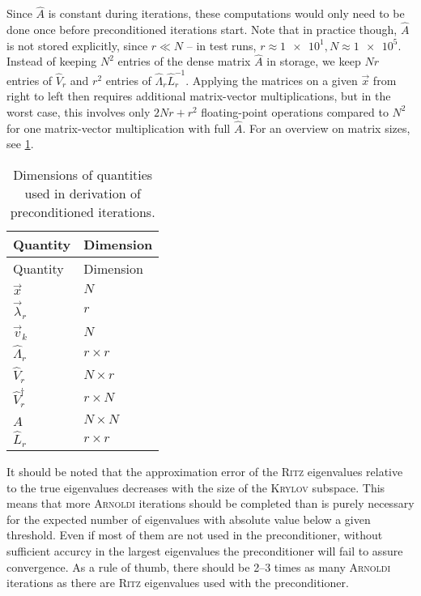 Since $\hat{A}$ is constant during iterations, these computations would only need to be done once before preconditioned iterations start. Note that in practice though, $\hat{A}$ is not stored explicitly, since $r \ll N$ -- in test runs, $r \approx \num{1e1}, N \approx \num{1e5}$. Instead of keeping $N^2$ entries of the dense matrix $\hat{A}$ in storage, we keep $N r$ entries of $\hat{V}_{r}$ and $r^2$ entries of $\hat{\Lambda}_{r} \hat{L}_{r}^{-1}$. Applying the matrices on a given $\vec{x}$ from right to left then requires additional matrix-vector multiplications, but in the worst case, this involves only $2 N r + r^2$ floating-point operations compared to $N^2$ for one matrix-vector multiplication with full $\hat{A}$. For an overview on matrix sizes, see \cref{tab:matrix_dimensions}.
\begin{longtable}{ll}
  \caption{Dimensions of quantities used in derivation of preconditioned iterations.}
  \label{tab:matrix_dimensions} \\
  \toprule
  Quantity & Dimension \\
  \midrule
  \endfirsthead
  \toprule
  Quantity & Dimension \\
  \midrule
  \endhead
  $\vec{x}$ & $N$ \\
  $\vec{\lambda}_{r}$ & $r$ \\
  $\vec{v}_{k}$ & $N$ \\
  $\hat{\Lambda}_{r}$ & $r \times r$ \\
  $\hat{V}_{r}$ & $N \times r$ \\
  $\hat{V}_{r}^{\dagger}$ & $r \times N$ \\
  $\hat{A}$ & $N \times N$ \\
  $\hat{L}_{r}$ & $r \times r$ \\
  \bottomrule
\end{longtable}
It should be noted that the approximation error of the \textsc{Ritz} eigenvalues relative to the true eigenvalues decreases with the size of the \textsc{Krylov} subspace. This means that more \textsc{Arnoldi} iterations should be completed than is purely necessary for the expected number of eigenvalues with absolute value below a given threshold. Even if most of them are not used in the preconditioner, without sufficient accurcy in the largest eigenvalues the preconditioner will fail to assure convergence. As a rule of thumb, there should be \numrange{2}{3} times as many \textsc{Arnoldi} iterations as there are \textsc{Ritz} eigenvalues used with the preconditioner.

